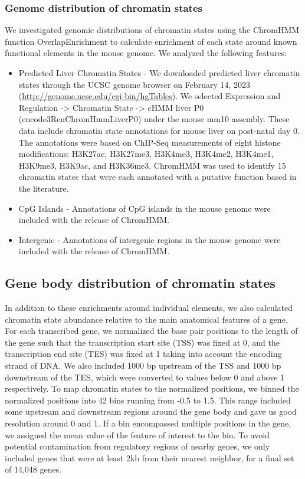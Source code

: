 \documentclass[
  11pt,
]{article}
\begin{document}
\hypertarget{genome-distribution-of-chromatin-states}{%
\subsubsection{Genome distribution of chromatin
states}\label{genome-distribution-of-chromatin-states}}

We investigated genomic distributions of chromatin states using the
ChromHMM function OverlapEnrichment to calculate enrichment of each
state around known functional elements in the mouse genome. We analyzed
the following features:

\begin{itemize}
\item
  Predicted Liver Chromatin States - We downloaded predicted liver
  chromatin states through the UCSC genome browser on February 14, 2023
  (\url{http://genome.ucsc.edu/cgi-bin/hgTables}). We selected
  Expression and Regulation -\textgreater{} Chromatin State
  -\textgreater{} cHMM liver P0 (encode3RenChromHmmLiverP0) under the
  mouse mm10 assembly. These data include chromatin state annotations
  for mouse liver on post-natal day 0. The annotations were based on
  ChIP-Seq measurements of eight histone modifications: H3K27ac,
  H3K27me3, H3K4me3, H3K4me2, H3K4me1, H3K9me3, H3K9ac, and H3K36me3.
  ChromHMM was used to identify 15 chromatin states that were each
  annotated with a putative function based in the literature.
\item
  CpG Islands - Annotations of CpG islands in the mouse genome were
  included with the release of ChromHMM.
\item
  Intergenic - Annotations of intergenic regions in the mouse genome
  were included with the release of ChromHMM.
\end{itemize}

\hypertarget{gene-body-distribution-of-chromatin-states}{%
\subsection{Gene body distribution of chromatin
states}\label{gene-body-distribution-of-chromatin-states}}

In addition to these enrichments around individual elements, we also
calculated chromatin state abundance relative to the main anatomical
features of a gene. For each transcribed gene, we normalized the base
pair positions to the length of the gene such that the transcription
start site (TSS) was fixed at 0, and the transcription end site (TES)
was fixed at 1 taking into account the encoding strand of DNA. We also
included 1000 bp upstream of the TSS and 1000 bp downstream of the TES,
which were converted to values below 0 and above 1 respectively. To map
chromatin states to the normalized positions, we binned the normalized
positions into 42 bins running from -0.5 to 1.5. This range included
some upstream and downstream regions around the gene body and gave us
good resolution around 0 and 1. If a bin encompassed multiple positions
in the gene, we assigned the mean value of the feature of interest to
the bin. To avoid potential contamination from regulatory regions of
nearby genes, we only included genes that were at least 2kb from their
nearest neighbor, for a final set of 14,048 genes.
\end{document}
